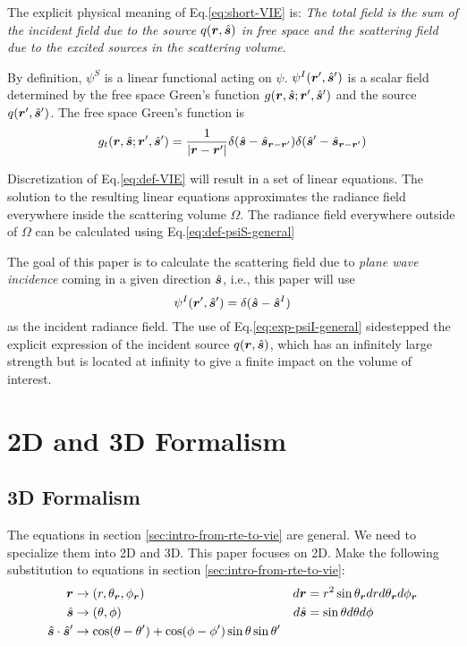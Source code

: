 \documentclass [10pt,letterpaper]{article}
\renewcommand{\vec}{\vectorsym}
\newcommand{\unitvec}[1]{\hat{\vec{#1}}}
\begin{document}
The explicit physical meaning of Eq.\eqref{eq:short-VIE} is: \emph{The total field is the sum of the incident field due to the source $q(\vec{r},\unitvec{s})$ in free space and the scattering field due to the excited sources in the scattering volume}.

By definition, $\psi^S$ is a linear functional acting on $\psi$. $\psi^I(\vec{r}^\prime,\unitvec{s}^\prime)$ is a scalar field determined by the free space Green's function $g(\vec{r},\unitvec{s};\vec{r}^\prime,\unitvec{s}^\prime)$ and the source $q(\vec{r}^\prime,\unitvec{s}^\prime)$.
The free space Green's function is
\begin{equation} \label{eq:exp-gf-general}
	g_t(\vec{r},\unitvec{s};\vec{r}^\prime,\unitvec{s}^\prime)
	=
	\frac
	{1}
	{\lvert \vec{r}-\vec{r}^\prime \rvert}
	\delta(\unitvec{s}-\unitvec{s}_{\vec{r}-\vec{r}^\prime})
	\delta(\unitvec{s}^\prime-\unitvec{s}_{\vec{r}-\vec{r}^\prime})
\end{equation}

Discretization of Eq.\eqref{eq:def-VIE} will result in a set of linear equations. The solution to the resulting linear equations approximates the radiance field everywhere inside the scattering volume
$\Omega$. The radiance field everywhere outside of $\Omega$ can be calculated using Eq.\eqref{eq:def-psiS-general}

The goal of this paper is to calculate the scattering field due to \emph{plane wave incidence} coming in a given direction $\unitvec{s}$, i.e., this paper will use
\begin{equation}\label{eq:exp-psiI-general}
	\psi^I(\vec{r}^\prime,\unitvec{s}^\prime)=\delta(\unitvec{s}-\unitvec{s}^I)
\end{equation}
as the incident radiance field. The use of Eq.\eqref{eq:exp-psiI-general} sidestepped the explicit expression of the incident source $q(\vec{r},\unitvec{s})$, which has an infinitely large strength but is located at infinity to give a finite impact on the volume of interest.

\section{2D and 3D Formalism}
\label{sec:2d-and-3d-formalism}
\subsection{3D Formalism}
The equations in section \ref{sec:intro-from-rte-to-vie} are general. We need to specialize them into 2D and 3D. This paper focuses on 2D.
Make the following substitution to equations in section \ref{sec:intro-from-rte-to-vie}:
\begin{align*}
	\vec{r} & \rightarrow(r,\theta_{\vec{r}},\phi_{\vec{r}}) & d\vec{r} &= r^2 \sin\theta_{\vec{r}} dr d\theta_{\vec{r}}d\phi_{\vec{r}} \\
	\unitvec{s} & \rightarrow(\theta,\phi) & d\unitvec{s} &= \sin\theta d\theta d\phi \\
	\unitvec{s}\cdot\unitvec{s}^\prime & \rightarrow \cos(\theta-\theta^\prime)+\cos(\phi-\phi^\prime)\sin\theta\sin\theta^\prime & & 
\end{align*}
\end{document}
